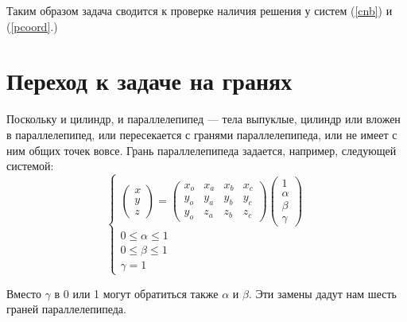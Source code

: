 \documentclass[pdftex,ptm,12pt,a4paper]{report}
\begin{document}
      Таким образом задача сводится к проверке наличия решения у систем (\ref{cnb}) и (\ref{pcoord}.)
\section{Переход к задаче на гранях}
    Поскольку и цилиндр, и параллелепипед --- тела выпуклые, цилиндр или вложен в параллелепипед, или пересекается с гранями параллелепипеда, или не имеет с ним общих точек вовсе.
    Грань параллелепипеда задается, например, следующей системой:
    \begin{equation}\label{planecoord}
      \begin{cases}
        \begin{pmatrix} x \\ y \\ z \end{pmatrix}
        =
        \begin{pmatrix} x_o & x_a & x_b & x_c \\ y_o & y_a & y_b & y_c  \\ y_o & z_a & z_b & z_c
        \end{pmatrix} \begin {pmatrix} 1 \\ \alpha \\ \beta \\ \gamma \end{pmatrix} \\
        0 \le  \alpha   \le  1 \\
        0 \le  \beta   \le  1 \\
        \gamma   =  1
      \end{cases}
    \end{equation}

    Вместо $\gamma$ в 0 или 1 могут обратиться также $\alpha$ и $\beta$.
    Эти замены дадут нам шесть граней параллелепипеда.
\end{document}
